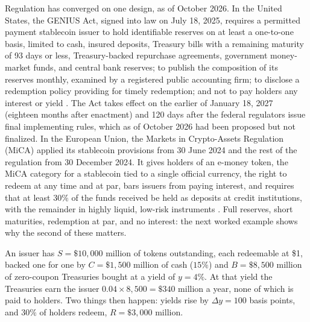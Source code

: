 \documentclass[../ai_in_finance]{subfiles}
\begin{document}
Regulation has converged on one design, as of October 2026. In the United States, the GENIUS Act, signed into law on July 18, 2025, requires a permitted payment stablecoin issuer to hold identifiable reserves on at least a one-to-one basis, limited to cash, insured deposits, Treasury bills with a remaining maturity of 93 days or less, Treasury-backed repurchase agreements, government money-market funds, and central bank reserves; to publish the composition of its reserves monthly, examined by a registered public accounting firm; to disclose a redemption policy providing for timely redemption; and not to pay holders any interest or yield \parencite{us2025genius}. The Act takes effect on the earlier of January 18, 2027 (eighteen months after enactment) and 120 days after the federal regulators issue final implementing rules, which as of October 2026 had been proposed but not finalized. In the European Union, the Markets in Crypto-Assets Regulation (MiCA) applied its stablecoin provisions from 30 June 2024 and the rest of the regulation from 30 December 2024. It gives holders of an e-money token, the MiCA category for a stablecoin tied to a single official currency, the right to redeem at any time and at par, bars issuers from paying interest, and requires that at least $30\%$ of the funds received be held as deposits at credit institutions, with the remainder in highly liquid, low-risk instruments \parencite{eu2023mica}. Full reserves, short maturities, redemption at par, and no interest: the next worked example shows why the second of these matters.

\label{sec:stablecoin-run}

An issuer has $S = \$10{,}000$ million of tokens outstanding, each redeemable at \$1, backed one for one by $C = \$1{,}500$ million of cash ($15\%$) and $B = \$8{,}500$ million of zero-coupon Treasuries bought at a yield of $y = 4\%$. At that yield the Treasuries earn the issuer $0.04 \times 8{,}500 = \$340$ million a year, none of which is paid to holders. Two things then happen: yields rise by $\Delta y = 100$ basis points, and $30\%$ of holders redeem, $R = \$3{,}000$ million.
\end{document}
